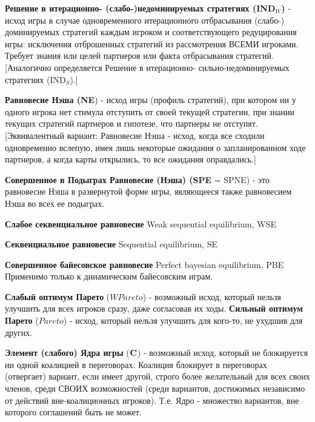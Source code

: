 \documentclass[pdftex,12pt,a4paper]{article}
\def\Par{Pareto} %
\begin{document}
\textbf{Решение в итерационно-
(слабо-)недоминируемых стратегиях (IND${}_W$)} -
исход игры в случае одновременного итерационного
отбрасывания (слабо-) доминируемых стратегий каждым
игроком и соответствующего редуцирования игры:
исключения отброшенных стратегий из рассмотрения
ВСЕМИ игроками. Требует знания или целей партнеров
или факта отбрасывания стратегий. [Аналогично
определяется Решение в итерационно-
сильно-недоминируемых стратегиях
(IND${}_S$).]\vspace{2mm}

\textbf{Равновесие Нэша (NE}) -  исход игры
(профиль стратегий), при котором ни у одного игрока
нет стимула отступить от своей текущей стратегии,
при знании текущих стратегий партнеров и гипотезе,
что партнеры не отступят. [Эквивалентный вариант:
Равновесие Нэша - исход, когда все сходили
одновременно вслепую, имея лишь некоторые ожидания
о запланированном ходе партнеров, а когда карты
открылись, то все ожидания
оправдались.]\vspace{2mm}

\textbf{Совершенное в Подыграх Равновесие (Нэша)
(SPE} = SPNE) - это равновесие Нэша в развернутой
форме игры, являющееся также равновесием Нэша во
всех ее подыграх. 
\vspace{2mm}


\textbf{Слабое секвенциальное равновесие} Weak sequential equilibrium, WSE

\vspace{2mm}


\textbf{Секвенциальное равновесие} Sequential equilibrium, SE

\vspace{2mm}

\textbf{Совершенное байесовское равновесие} Perfect bayesian equilibrium, PBE
Применимо только к динамическим байесовским играм.
\vspace{2mm}






\textbf{Слабый оптимум Парето} ($W\Par$) -
возможный исход, который нельзя улучшить для всех
игроков сразу, даже согласовав их ходы.
\textbf{Сильный оптимум Парето} ($\Par$) - исход,
который нельзя улучшить для кого-то, не ухудшив для
других. \vspace{2mm}

\textbf{Элемент (слабого) Ядра игры} (${\bf C}$) -
возможный исход, который не блокируется ни одной
коалицией в переговорах. Коалиция блокирует в
переговорах (отвергает) вариант, если имеет другой,
строго более желательный для всех своих членов,
среди СВОИХ возможностей (среди вариантов,
достижимых независимо от действий вне-коалиционных
игроков). Т.е. Ядро - множество вариантов, вне
которого соглашений быть не может. \vspace{2mm}
\end{document}
